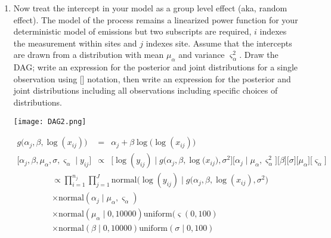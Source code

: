 \documentclass[12pt, oneside]{article}
\newif\ifanswers
\begin{document}
\begin{enumerate} [leftmargin=*]
\ifanswers
What are assuming about the distribution of the untransformed $\mu_i$?  It is lognormal. Be sure you understand this.
\fi

\newpage

\item Now treat the intercept in your model as a group level effect (aka, random effect). The model of the process remains a linearized power function for your deterministic model of emissions but two subscripts are required, $i$ indexes the measurement within sites and $j$ indexes site. Assume that the intercepts are drawn from a distribution with mean $\mu_{\alpha}$ and variance $\varsigma_{\alpha}^2$. Draw the DAG; write an expression for the posterior and joint distributions for a single observation using [] notation, then write an expression for the posterior and joint distributions including all observations including specific choices of distributions. 

\ifanswers
\newpage
\begin{center}
\texttt{[image: DAG2.png]}
\end{center}

\begin{eqnarray*}
g\big(\alpha_{j},\beta,\log(x_{ij})\big)&=& \alpha_{j}+\beta\log\big(\log(x_{ij})\big)\\
\big[\alpha_{j},\beta,\mu_{\alpha},\sigma,\varsigma_{\alpha}\mid y_{ij}\big] & \propto & \big[\log(y_{ij})\mid g\big(\alpha_{j},\beta,\log(x_{ij}\big),\sigma^{2}\big]\big[\alpha_{j}\mid\mu_{\alpha},\varsigma_{\alpha}^{2}\big]\big[\beta\big]\big[\sigma\big]\big[\mu_{\alpha}\big]\big[\varsigma_{\alpha}\big]\label{eq:mean model for N02 intecept}\
\end{eqnarray*}
\begin{align*}
[\bm{\alpha},\beta,\sigma,\mu_\alpha,\varsigma_\alpha \mid \mathbf{y}]&\propto \prod_{i=1}^{n_j} \prod_{j=1}^{J}\text{normal}(\log(y_{ij})\mid g\big(\alpha_j,\beta,\log(x_{ij}),\sigma^2\big)\\
&\times \text{normal}(\alpha_j \mid\mu_{\alpha},\varsigma_{\alpha})\\
&\times\text{normal}(\mu_{\alpha}\mid 0,10000)\text{uniform}(\varsigma(0,100)\\
&\times\text{normal}(\beta \mid 0,10000)\text{uniform}(\sigma\mid0,100)
\end{align*}


\end{enumerate}
\end{document}
